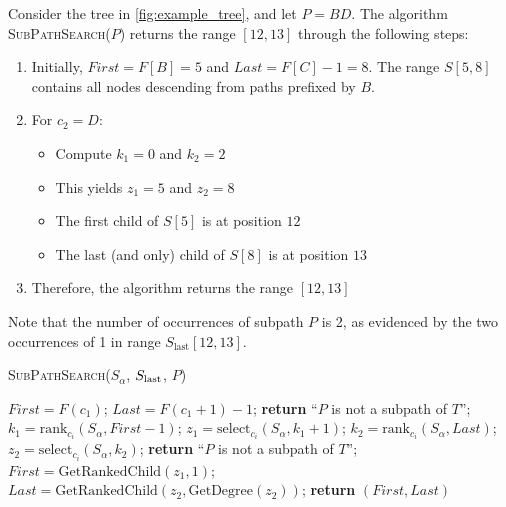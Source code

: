 \begin{example}
    Consider the tree in \cref{fig:example_tree}, and let $P = BD$. The algorithm \textsc{SubPathSearch}($P$) returns the range $[12, 13]$ through the following steps:

    \begin{enumerate}
        \item Initially, $First = F[B] = 5$ and $Last = F[C] - 1 = 8$. The range $S[5,8]$ contains all nodes descending from paths prefixed by $B$.
        
        \item For $c_2 = D$:
        \begin{itemize}
            \item Compute $k_1 = 0$ and $k_2 = 2$
            \item This yields $z_1 = 5$ and $z_2 = 8$
            \item The first child of $S[5]$ is at position $12$
            \item The last (and only) child of $S[8]$ is at position $13$
        \end{itemize}
        
        \item Therefore, the algorithm returns the range $[12,13]$
    \end{enumerate}

    Note that the number of occurrences of subpath $P$ is 2, as evidenced by the two occurrences of 1 in range $S_{\text{last}}[12,13]$.
\end{example}

\begin{algorithm}[H]
    \caption{\textsc{SubPathSearch}($S_\alpha$, $S_{\textup{last}}$, $P$)}
    \label{alg:subpathsearch}
    \begin{algorithmic}[1]
    \State $First = F(c_1)$; $Last = F(c_1 + 1) - 1$;
        \State \textbf{return} ``$P$ is not a subpath of $T$'';
    \EndIf
        \State $k_1 = \text{rank}_{c_i}(S_\alpha, First - 1)$; 
        \State $z_1 = \text{select}_{c_i}(S_\alpha, k_1 + 1)$;
        \State $k_2 = \text{rank}_{c_i}(S_\alpha, Last)$; 
        \State $z_2 = \text{select}_{c_i}(S_\alpha, k_2)$;
            \State \textbf{return} ``$P$ is not a subpath of $T$'';
        \EndIf
        \State $First = \text{GetRankedChild}(z_1, 1)$; 
        \State $Last = \text{GetRankedChild}(z_2, \text{GetDegree}(z_2))$; 
    \EndFor
    \State \textbf{return} $(First, Last)$
    \end{algorithmic}
\end{algorithm}


